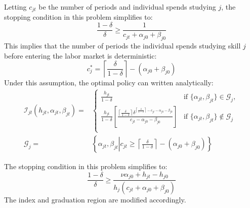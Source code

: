 \documentclass[10 pt]{article}
\newcommand{\sbr}[1]{\left[ #1 \right]}
\begin{document}
\begin{outline}



Letting $c_{jt}$ be the number of periods and individual spends studying $j$, the stopping condition in this problem simplifies to:
\begin{equation*}
	\frac{1- \delta}{\delta} \geq \frac{1}{c_{jt} + \alpha_{j0} + \beta_{j0}}
\end{equation*}
This implies that the number of periods the individual spends studying skill $j$ before entering the labor market is deterministic: 
\begin{equation}\label{bb-mj}
	c_j^* = \left\lceil \frac{\delta}{1 - \delta} \right\rceil - (\alpha_{j0} + \beta_{j0})
\end{equation}
Under this assumption, the optimal policy can written analytically:
\begin{align*}
\mathcal{I}_{jt} (h_{jt}, \alpha_{jt}, \beta_{jt}) = &
\begin{cases}
\frac{h_{jt}}{1 - \delta} & \text{if } \{\alpha_{jt}, \beta_{jt}\} \in \mathcal{G}_{j}, \\
\frac{h_{jt}}{1 - \delta} \sbr{
   \frac{
      \left\lceil \frac{\delta}{1 - \delta} \right\rceil
      \delta^{\left\lceil \frac{\delta}{1 - \delta} \right\rceil - c_{jt} - \alpha_{j0} - \beta_{j0}}}
   {c_{jt} - \alpha_{j0} - \beta_{j0}}
   } & \text{if } \{\alpha_{jt}, \beta_{jt}\} \notin \mathcal{G}_{j} \\
\end{cases} \\
   \mathcal{G}_j = & \left\{ \alpha_{jt}, \beta_{jt} \left\vert c_{jt} \geq \left\lceil \frac{\delta}{1 - \delta} \right\rceil - (\alpha_{j0} + \beta_{j0}) \right. \right\}
\end{align*}



The stopping condition in this problem simplifies to:
\begin{equation}\label{stop}
	\frac{1- \delta}{\delta} \geq 
	\frac{\nu \alpha_{j0} + h_{jt} - h_{j0}}{h_j(c_{jt} + \alpha_{j0} + \beta_{j0})}
\end{equation}
The index and graduation region are modified accordingly. 

\end{outline}
\end{document}
